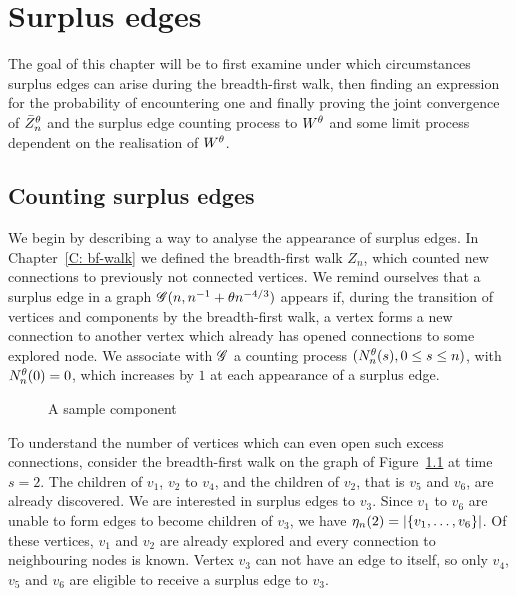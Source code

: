 
\chapter{Surplus edges} \label{C: surplus edges}

The goal of this chapter will be to first examine under which circumstances surplus edges can arise during the breadth-first walk,
then finding an expression for the probability of encountering one 
and finally proving the joint convergence of $\bar{Z}^{\theta}_n$ and the surplus edge counting process to $W^{\theta}$ and some limit process dependent on the realisation of $W^{\theta}$.


\section{Counting surplus edges}

We begin by describing a way to analyse the appearance of surplus edges.
In Chapter~\ref{C: bf-walk} we defined the breadth-first walk $Z_n$, 
which counted new connections to previously not connected vertices.
We remind ourselves that a surplus edge in a graph $\mathscr{G}(n, n^{-1} + \theta n^{-4/3})$ appears if,
during the transition of vertices and components by the breadth-first walk,
a vertex forms a new connection to another vertex
which already has opened connections to some explored node.
We associate with $\mathscr{G}$ a counting process $(N_n^{\theta}(s), 0 \leq s \leq n)$,
with $N_n^{\theta}(0) = 0$, which increases by $1$ at each appearance of a surplus edge.

\begin{figure}[ht]
	
	\caption{A sample component} 
	\label{F: Surplus Edges Tree}
\end{figure}

To understand the number of vertices which can even open such excess connections, 
consider the breadth-first walk on the graph of Figure~\ref{F: Surplus Edges Tree} at time $s=2$.
The children of $v_1$, $v_2$ to $v_4$, and the children of $v_2$, that is $v_5$ and $v_6$, are already discovered.
We are interested in surplus edges to $v_3$.
Since $v_1$ to $v_6$ are unable to form edges to become children of $v_3$, we have $\eta_n(2) = |\{ v_1, \dots,  v_6\}|$.
Of these vertices, $v_1$ and $v_2$ are already explored and every connection to neighbouring nodes is known.
Vertex $v_3$ can not have an edge to itself, so only $v_4$, $v_5$ and $v_6$ are eligible to receive a surplus edge to $v_3$.

